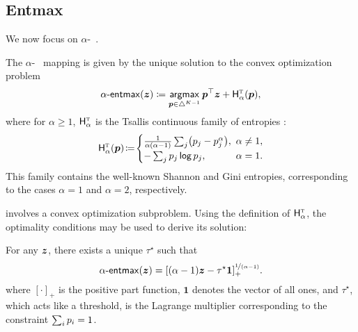 \subsection{Entmax}\label{sec:entmax_bg}

\noindent We now focus on $\alpha$-\entmaxtext~\citep{blondel2019learning,entmax}.

\newpage

\begin{definition}[$\alpha$-\entmaxtext]
    The $\alpha$-\entmaxtext~\citep{blondel2019learning,entmax} mapping
    is given by the unique solution to the convex optimization problem
    \begin{equation}\label{eq:define_entmax}
        \mathop{\mathsf{\alpha}\textnormal{-}\mathsf{entmax}}(\bm{z}) \coloneqq
        \operatorname*{\mathsf{argmax}}_{\bm{p} \in \triangle^{K-1}} \bm{p}^\top\bm{z} + \mathsf{H}^{{\textsc{t}}}_{\alpha}(\bm{p}),
    \end{equation}
    where for $\alpha\geq1$,
    $\mathsf{H}^{{\textsc{t}}}_\alpha$ is the Tsallis continuous family of entropies
    \citep{Tsallis1988}:
    \begin{equation}\label{eq:tsallisdef}
        \HHt_{\alpha}(\bm{p})\!\coloneqq\!
        \begin{cases}
            \frac{1}{\alpha(\alpha-1)}\sum_j\!\left(p_j - p_j^\alpha\right)\!, &
            \!\!\!\alpha \ne 1,                                                  \\
            -\sum_j \pp_j \log \pp_j,                                          &
            \!\!\!\alpha = 1.
        \end{cases}
    \end{equation}
    This family contains the well-known Shannon and Gini entropies,
    corresponding to the cases $\alpha=1$ and $\alpha=2$, respectively.
\end{definition}

 involves a convex optimization subproblem. Using the
definition of $\mathsf{H}^{{\textsc{t}}}_\alpha$, the optimality conditions may be used to derive its solution:

\begin{lemma}
    \label{lemma:tsallis_reduction}%
    For any $\bm{z}$, there exists a unique $\tau^\star$ such that
    \begin{equation}\label{eq:entmax_form}
        \mathop{\mathsf{\alpha}\textnormal{-}\mathsf{entmax}}(\bm{z})
        = [(\alpha - 1){\bm{z}} - \tau^\star \bm{1}]_+^{\nicefrac{1}{\left(\alpha-1\right)}}.
    \end{equation}
    where $[\cdot]_+$ is the positive part function, $\bm{1}$
    denotes the vector of all ones, and $\tau^\star$, which acts like a
    threshold, is the Lagrange multiplier corresponding to the constraint $\sum_i
        p_i=1$.
\end{lemma}

